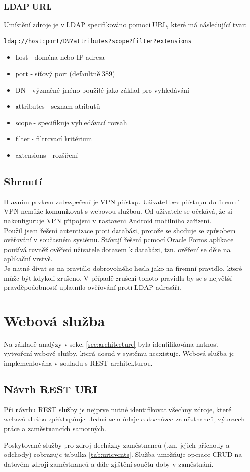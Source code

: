 \documentclass{diplomka}
\begin{document}
\subsection*{LDAP URL}
Umístění zdroje je v LDAP specifikováno pomocí URL, které má následující tvar:
\begin{verbatim}
ldap://host:port/DN?attributes?scope?filter?extensions
\end{verbatim}
\begin{itemize}[noitemsep,nolistsep]
\item host - doména nebo IP adresa
\item port - síťový port (defaultně 389)
\item DN - význačné jméno použité jako základ pro vyhledávání
\item attributes -  seznam atributů
\item scope - specifikuje vyhledávací rozsah  
\item filter - filtrovací kritérium
\item extensions - rozšíření
\end{itemize}

\section{Shrnutí}
Hlavním prvkem zabezpečení je VPN přístup. Uživatel bez přístupu do firemní VPN nemůže komunikovat s webovou službou. Od uživatele se očekává, že si nakonfiguruje VPN připojení v nastavení Android mobilního zařízení.\\ \indent
Použil jsem řešení autentizace proti databázi, protože se shoduje se způsobem ověřování v současném systému. Stávají řešení pomocí Oracle Forms aplikace používá rovněž ověření uživatele dotazem k databázi, tzn. ověření se děje na aplikační vrstvě. \\ \indent
Je nutné dívat se na pravidlo dobrovolného hesla jako na firemní pravidlo, které může být kdykoli zrušeno. V případě zrušení tohoto pravidla by se s největší pravděpodobností uplatnilo ověřování proti LDAP adresáři. 

\chapter{Webová služba}
Na základě analýzy v sekci \ref{sec:architecture} byla identifikována nutnost vytvoření webové služby, která dosud v systému neexistuje. Webová služba je implementována v souladu s REST architekturou. 


\section{Návrh REST URI}
Při návrhu REST služby je nejprve nutné identifikovat všechny zdroje, které webová služba zpřístupňuje\cite{restdesign}. Jedná se o údaje o docházce zaměstnanců, výkazech práce a zaměstnancích samotných. 
 \par
Poskytované služby pro zdroj docházky zaměstnanců (tzn. jejich příchody a odchody) zobrazuje tabulka \ref{tab:urievents}. Služba umožňuje operace CRUD na datovém zdroji zaměstnanců a dále zjištění součtu doby v zaměstnání.
\end{document}
